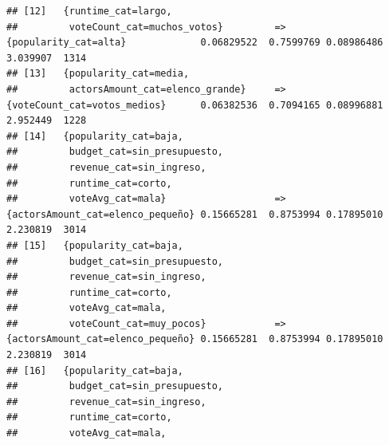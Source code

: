 \documentclass[
]{article}
\begin{document}
\begin{verbatim}
## [12]   {runtime_cat=largo,                                                                                                      
##         voteCount_cat=muchos_votos}         => {popularity_cat=alta}             0.06829522  0.7599769 0.08986486 3.039907  1314
## [13]   {popularity_cat=media,                                                                                                   
##         actorsAmount_cat=elenco_grande}     => {voteCount_cat=votos_medios}      0.06382536  0.7094165 0.08996881 2.952449  1228
## [14]   {popularity_cat=baja,                                                                                                    
##         budget_cat=sin_presupuesto,                                                                                             
##         revenue_cat=sin_ingreso,                                                                                                
##         runtime_cat=corto,                                                                                                      
##         voteAvg_cat=mala}                   => {actorsAmount_cat=elenco_pequeño} 0.15665281  0.8753994 0.17895010 2.230819  3014
## [15]   {popularity_cat=baja,                                                                                                    
##         budget_cat=sin_presupuesto,                                                                                             
##         revenue_cat=sin_ingreso,                                                                                                
##         runtime_cat=corto,                                                                                                      
##         voteAvg_cat=mala,                                                                                                       
##         voteCount_cat=muy_pocos}            => {actorsAmount_cat=elenco_pequeño} 0.15665281  0.8753994 0.17895010 2.230819  3014
## [16]   {popularity_cat=baja,                                                                                                    
##         budget_cat=sin_presupuesto,                                                                                             
##         revenue_cat=sin_ingreso,                                                                                                
##         runtime_cat=corto,                                                                                                      
##         voteAvg_cat=mala,                                                                                                       

\end{verbatim}
\end{document}
